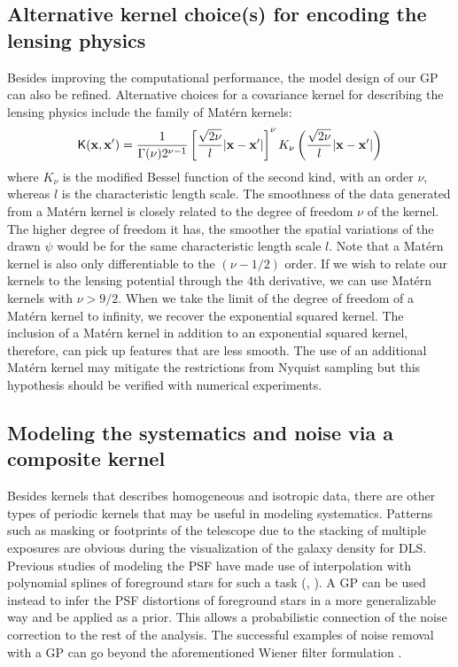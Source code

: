 \subsection{Alternative kernel choice(s) for encoding the lensing physics}
Besides improving the computational performance, the model design of our GP can
also be refined.
Alternative choices for a covariance kernel for describing the lensing physics 
include the family of Mat\'{e}rn kernels:
\begin{equation}
	\mathsf{K}(\mathbf{x}, \mathbf{x}') = \frac{1}{\Gamma(\nu)2^{\nu-1}}\left[
		\frac{\sqrt{2\nu}}{l}|\mathbf{x} - \mathbf{x}'|
	\right]^\nu K_\nu \left(\frac{\sqrt{2\nu}}{l}|\mathbf{x}-\mathbf{x}'|\right) 
\end{equation}
where $K_\nu$ is the modified Bessel function of the second kind, with an order
$\nu$, whereas $l$ is the characteristic length scale.
The smoothness of the data generated from a Mat\'{e}rn kernel is closely
related to the degree of freedom $\nu$ of the kernel. 
The higher degree of freedom it has, the smoother the spatial variations of the
drawn $\psi$ would be for the same characteristic length scale $l$.
Note that a Mat\'{e}rn kernel is also only differentiable to the $(\nu-1/2)$ order.
If we wish to relate our kernels to the lensing potential through the 4th
derivative, we can use Mat\'{e}rn kernels with $\nu > 9/2$. 
When we take the limit of the degree of freedom of a Mat\'{e}rn kernel to infinity, 
we recover the exponential squared kernel. The inclusion of a Mat\'{e}rn kernel
in addition to an exponential squared kernel, therefore, can pick up features
that are less smooth. The use of an additional Mat\'{e}rn kernel may mitigate the
restrictions from Nyquist sampling but this hypothesis should be verified with
numerical experiments. 

 

\subsection{Modeling the systematics and noise via a composite kernel}
Besides kernels that describes homogeneous and isotropic data,
there are other types of periodic kernels that may be useful
in modeling systematics. 
Patterns such as masking or footprints of the telescope due to the
stacking of multiple exposures are obvious during the visualization of the
galaxy density for DLS. 
Previous studies of modeling the PSF
have made use of interpolation with polynomial splines of foreground stars 
for such a task (\citealt{Rowe2010},
\citealt{Jee2013a}).  A GP can be used instead to infer the PSF distortions
of foreground stars in a more generalizable way and be
applied as a prior. This allows a probabilistic connection of the noise correction to the rest of the
analysis. The successful examples of noise removal with a GP can go beyond 
the aforementioned Wiener filter formulation \citep{Perez-Cruz2013}.

